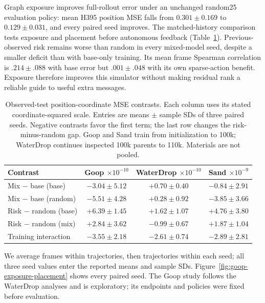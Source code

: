 Graph exposure improves full-rollout error under an unchanged random25 evaluation policy: mean H395 position MSE falls from $0.301\pm0.169$ to $0.129\pm0.031$, and every paired seed improves. The matched-history comparison tests exposure and placement before autonomous feedback (Table~\ref{tab:goop-exposure-placement}). Previous-observed risk remains worse than random in every mixed-model seed, despite a smaller deficit than with base-only training. Its mean frame Spearman correlation is $.214\pm.088$ with base error but $.001\pm.048$ with its own sparse-action benefit. Exposure therefore improves this simulator without making residual rank a reliable guide to useful extra messages.

\begin{table}[t]
\centering\scriptsize
\caption{Observed-test position-coordinate MSE contrasts. Each column uses its stated coordinate-squared scale. Entries are means $\pm$ sample SDs of three paired seeds. Negative contrasts favor the first term; the last row changes the risk-minus-random gap. Goop and Sand train from initialization to 100k; WaterDrop continues inspected 100k parents to 110k. Materials are not pooled.}
\label{tab:goop-exposure-placement}
\setlength{\tabcolsep}{2pt}
\begin{tabular}{lccc}
\toprule
Contrast & \shortstack{Goop\\$\times10^{-10}$} & \shortstack{WaterDrop\\$\times10^{-10}$} & \shortstack{Sand\\$\times10^{-9}$}\\
\midrule
Mix $-$ base (base) & $-3.04\pm5.12$ & $+0.70\pm0.40$ & $-0.84\pm2.91$\\
Mix $-$ base (random) & $-5.51\pm4.28$ & $+0.28\pm0.92$ & $-3.85\pm3.66$\\
Risk $-$ random (base) & $+6.39\pm1.45$ & $+1.62\pm1.07$ & $+4.76\pm3.80$\\
Risk $-$ random (mix) & $+2.84\pm3.62$ & $-0.99\pm0.67$ & $+1.87\pm1.04$\\
Training interaction & $-3.55\pm2.18$ & $-2.61\pm0.74$ & $-2.89\pm2.81$\\
\bottomrule
\end{tabular}
\end{table}

We average frames within trajectories, then trajectories within each seed; all three seed values enter the reported means and sample SDs. Figure~\ref{fig:goop-exposure-placement} shows every paired seed. The Goop study follows the WaterDrop analyses and is exploratory; its endpoints and policies were fixed before evaluation.

